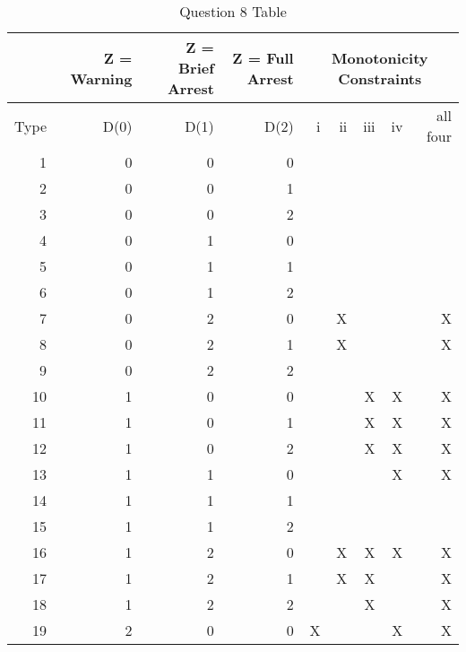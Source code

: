 \documentclass[11pt,notitlepage]{article}\usepackage[]{graphicx}\usepackage[]{color}
\begin{document}
\begin{table}[H]
  \centering
  \caption{Question 8 Table}
    \begin{tabular}{rrrrrrrrr}
    \toprule
          & Z = Warning & Z = Brief Arrest & Z = Full Arrest & \multicolumn{5}{c}{Monotonicity Constraints} \\
    \midrule
    Type  & D(0)  & D(1)  & D(2)  & i     & ii    & iii   & iv    & all four \\ \hline
    1     & 0     & 0     & 0     &       &       &       &       &  \\
    2     & 0     & 0     & 1     &       &       &       &       &  \\
    3     & 0     & 0     & 2     &       &       &       &       &  \\
    4     & 0     & 1     & 0     &       &       &       &       &  \\
    5     & 0     & 1     & 1     &       &       &       &       &  \\
    6     & 0     & 1     & 2     &       &       &       &       &  \\
    7     & 0     & 2     & 0     &       & X     &       &       & X \\
    8     & 0     & 2     & 1     &       & X     &       &       & X \\
    9     & 0     & 2     & 2     &       &       &       &       &  \\
    10    & 1     & 0     & 0     &       &       & X     & X     & X \\
    11    & 1     & 0     & 1     &       &       & X     & X     & X \\
    12    & 1     & 0     & 2     &       &       & X     & X     & X \\
    13    & 1     & 1     & 0     &       &       &       & X     & X \\
    14    & 1     & 1     & 1     &       &       &       &       &  \\
    15    & 1     & 1     & 2     &       &       &       &       &  \\
    16    & 1     & 2     & 0     &       & X     & X     & X     & X \\
    17    & 1     & 2     & 1     &       & X     & X     &       & X \\
    18    & 1     & 2     & 2     &       &       & X     &       & X \\
    19    & 2     & 0     & 0     & X     &       &       & X     & X \\

\end{tabular}
\end{table}
\end{document}
